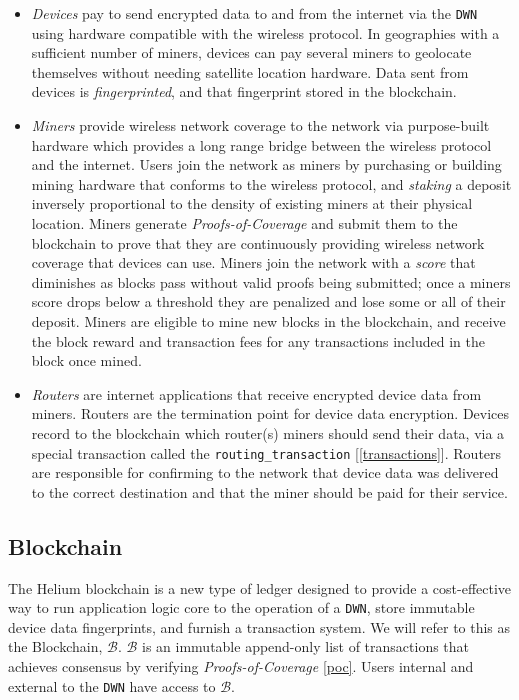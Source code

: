 \documentclass[letterpaper,11pt]{article}
\begin{document}
\begin{itemize}
	\item \textit{Devices} pay to send encrypted data to and from the internet via the \verb|DWN| using hardware compatible with the wireless protocol. In geographies with a sufficient number of miners, devices can pay several miners to geolocate themselves without needing satellite location hardware. Data sent from devices is \textit{fingerprinted}, and that fingerprint stored in the blockchain.
	\item \textit{Miners} provide wireless network coverage to the network via purpose-built hardware which provides a long range bridge between the wireless protocol and the internet. Users join the network as miners by purchasing or building mining hardware that conforms to the wireless protocol, and \textit{staking} a deposit inversely proportional to the density of existing miners at their physical location. Miners generate \textit{Proofs-of-Coverage} and submit them to the blockchain to prove that they are continuously providing wireless network coverage that devices can use. Miners join the network with a \textit{score} that diminishes as blocks pass without valid proofs being submitted; once a miners score drops below a threshold they are penalized and lose some or all of their deposit. Miners are eligible to mine new blocks in the blockchain, and receive the block reward and transaction fees for any transactions included in the block once mined.
	\item \textit{Routers} are internet applications that receive encrypted device data from miners. Routers are the termination point for device data encryption. Devices record to the blockchain which router(s) miners should send their data, via a special transaction called the \verb|routing_transaction| [\ref{transactions}]. Routers are responsible for confirming to the network that device data was delivered to the correct destination and that the miner should be paid for their service.
\end{itemize}

\subsection{Blockchain}

The Helium blockchain is a new type of ledger designed to provide a cost-effective way to run application logic core to the operation of a \verb|DWN|, store immutable device data fingerprints, and furnish a transaction system. We will refer to this as the Blockchain, $\mathcal{B}$. $\mathcal{B}$ is an immutable append-only list of transactions that achieves consensus by verifying \textit{Proofs-of-Coverage} \ref{poc}. Users internal and external to the \verb|DWN| have access to $\mathcal{B}$.\newline
\end{document}
